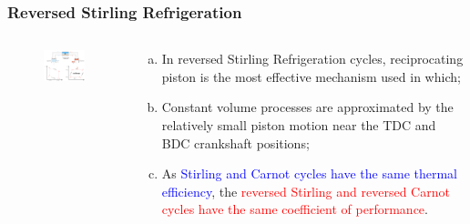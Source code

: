 \documentclass[10pt,compress]{beamer}
\begin{document}
\begin{frame}
 \frametitle{Reversed Stirling Refrigeration}
  \begin{columns}

   \begin{column}[c]{0.55\linewidth}
    \begin{figure}%
     \begin{center}
      \includegraphics[width=6.8cm,height=6.cm]{./Pics/Overview_Refrig9}
     \end{center}
    \end{figure}  
   \end{column}  

   \begin{column}[c]{0.45\linewidth}
    \begin{enumerate}[(a)]
     \item <1-> In reversed Stirling Refrigeration cycles, reciprocating piston is the most effective mechanism used in which;
     \item <2-> Constant volume processes are approximated by the relatively small piston motion near the TDC and BDC crankshaft positions;
     \item <3-> As \textcolor{blue}{Stirling and Carnot cycles have the same thermal efficiency}, the \textcolor{red}{reversed Stirling and reversed Carnot cycles have the same coefficient of performance}.
    \end{enumerate}
   \end{column}

  \end{columns}
\end{frame}
\end{document}
